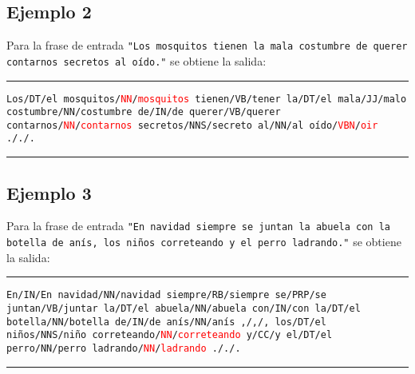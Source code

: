 \subsection*{Ejemplo 2}
Para la frase de entrada \texttt{"Los mosquitos tienen la mala costumbre de querer contarnos secretos al oído."} se obtiene la salida: \newline
\noindent\rule{14cm}{0.4pt}\newline
\texttt{Los/DT/el\newline
mosquitos/\textcolor{red}{NN}/\textcolor{red}{mosquitos}\newline
tienen/VB/tener\newline
la/DT/el\newline
mala/JJ/malo\newline
costumbre/NN/costumbre\newline
de/IN/de\newline
querer/VB/querer\newline
contarnos/\textcolor{red}{NN}/\textcolor{red}{contarnos}\newline
secretos/NNS/secreto\newline
al/NN/al\newline
oído/\textcolor{red}{VBN}/\textcolor{red}{oir}\newline
././.\newline
}
\noindent\rule{14cm}{0.4pt}\newline
\subsection*{Ejemplo 3}
Para la frase de entrada \texttt{"En navidad siempre se juntan la abuela con la botella de anís, los niños correteando y el perro ladrando."} se obtiene la salida: \newline
\noindent\rule{14cm}{0.4pt}\newline
\texttt{En/IN/En\newline
navidad/NN/navidad\newline
siempre/RB/siempre\newline
se/PRP/se\newline
juntan/VB/juntar\newline
la/DT/el\newline
abuela/NN/abuela\newline
con/IN/con\newline
la/DT/el\newline
botella/NN/botella\newline
de/IN/de\newline
anís/NN/anís\newline
,/,/,\newline
los/DT/el\newline
niños/NNS/niño\newline
correteando/\textcolor{red}{NN}/\textcolor{red}{correteando}\newline
y/CC/y\newline
el/DT/el\newline
perro/NN/perro\newline
ladrando/\textcolor{red}{NN}/\textcolor{red}{ladrando}\newline
././.\newline
}
\noindent\rule{14cm}{0.4pt}\newline